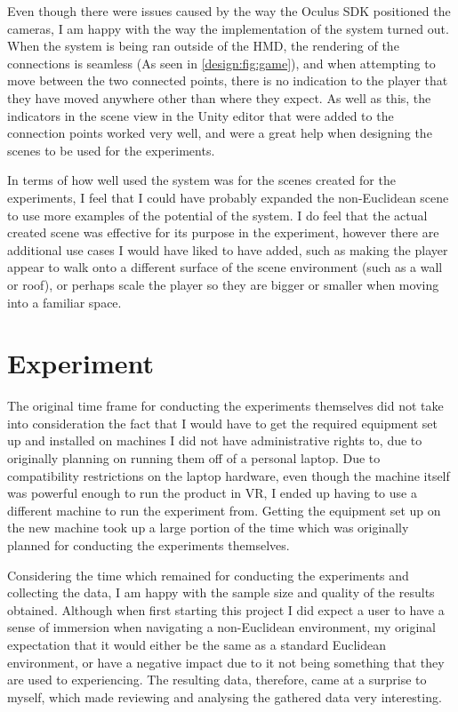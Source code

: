 		Even though there were issues caused by the way the Oculus SDK positioned the cameras, I am happy with the way the implementation of the system turned out.
		When the system is being ran outside of the HMD, the rendering of the connections is seamless (As seen in \autoref{design:fig:game}), and when attempting to move between the two connected points, there is no indication to the player that they have moved anywhere other than where they expect.
		As well as this, the indicators in the scene view in the Unity editor that were added to the connection points worked very well, and were a great help when designing the scenes to be used for the experiments.

		In terms of how well used the system was for the scenes created for the experiments, I feel that I could have probably expanded the non-Euclidean scene to use more examples of the potential of the system.
		I do feel that the actual created scene was effective for its purpose in the experiment, however there are additional use cases I would have liked to have added, such as making the player appear to walk onto a different surface of the scene environment (such as a wall or roof), or perhaps scale the player so they are bigger or smaller when moving into a familiar space.

	\section{Experiment}

		The original time frame for conducting the experiments themselves did not take into consideration the fact that I would have to get the required equipment set up and installed on machines I did not have administrative rights to, due to originally planning on running them off of a personal laptop.
		Due to compatibility restrictions on the laptop hardware, even though the machine itself was powerful enough to run the product in VR, I ended up having to use a different machine to run the experiment from.
		Getting the equipment set up on the new machine took up a large portion of the time which was originally planned for conducting the experiments themselves.
		
		Considering the time which remained for conducting the experiments and collecting the data, I am happy with the sample size and quality of the results obtained.
		Although when first starting this project I did expect a user to have a sense of immersion when navigating a non-Euclidean environment, my original expectation that it would either be the same as a standard Euclidean environment, or have a negative impact due to it not being something that they are used to experiencing.
		The resulting data, therefore, came at a surprise to myself, which made reviewing and analysing the gathered data very interesting.

